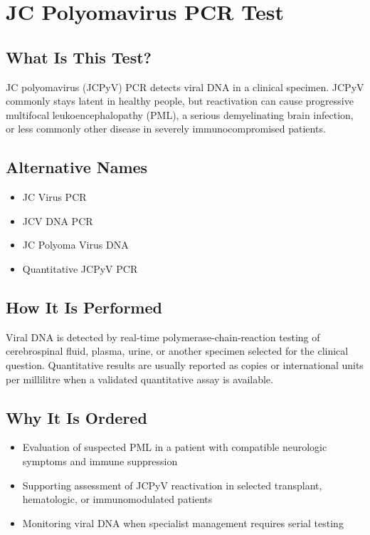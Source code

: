 \chapter{JC Polyomavirus PCR Test}

\section*{What Is This Test?}
JC polyomavirus (JCPyV) PCR detects viral DNA in a clinical specimen. JCPyV commonly stays latent in healthy people, but reactivation can cause progressive multifocal leukoencephalopathy (PML), a serious demyelinating brain infection, or less commonly other disease in severely immunocompromised patients.

\section*{Alternative Names}
\begin{itemize}
  \item JC Virus PCR
  \item JCV DNA PCR
  \item JC Polyoma Virus DNA
  \item Quantitative JCPyV PCR
\end{itemize}
\section*{How It Is Performed}
Viral DNA is detected by real-time polymerase-chain-reaction testing of cerebrospinal fluid, plasma, urine, or another specimen selected for the clinical question. Quantitative results are usually reported as copies or international units per millilitre when a validated quantitative assay is available.

\section*{Why It Is Ordered}
\begin{itemize}
  \item Evaluation of suspected PML in a patient with compatible neurologic symptoms and immune suppression
  \item Supporting assessment of JCPyV reactivation in selected transplant, hematologic, or immunomodulated patients
  \item Monitoring viral DNA when specialist management requires serial testing
\end{itemize}

